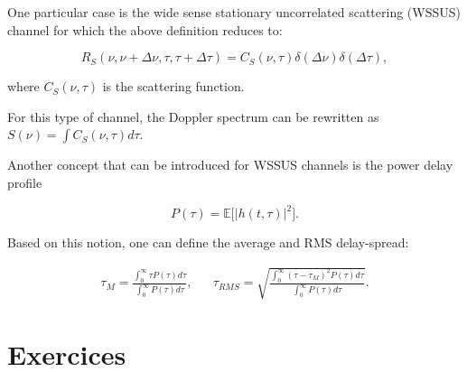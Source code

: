 \documentclass [a4paper, 11pt] {article}
\begin{document}
\begin{reminder}
\begin{itemize}
    
    
    One particular case is the wide sense stationary uncorrelated scattering (WSSUS) channel for which the above definition reduces to: 
    
        \begin{equation}
        R_S(\nu,\nu+\Delta \nu, \tau, \tau + \Delta \tau) = C_S(\nu, \tau) \delta(\Delta \nu) \delta(\Delta \tau),
        \end{equation}
    
    
    where $C_S(\nu, \tau)$ is the scattering function. 
    
    
    For this type of channel, the Doppler spectrum can be rewritten as $S(\nu) = \int C_S(\nu, \tau) d\tau$. 
    
    
    Another concept that can be introduced for WSSUS channels is the power delay profile
    
    \begin{equation}
    P(\tau) = \mathbb{E}\Big[|h(t,\tau)|^2\Big].
    \end{equation}
    
    Based on this notion, one can define the average and RMS delay-spread: 
    
    \begin{align}
    \tau_M = \frac{\int_0^\infty \tau P(\tau) d\tau}{\int_0^\infty P(\tau) d\tau}, && \tau_{RMS} = \sqrt{\frac{\int_0^\infty (\tau - \tau_M)^2 P(\tau) d\tau}{\int_0^\infty P(\tau) d\tau}}.
    \end{align}
    
    \end{itemize}
    \end{reminder}
    \pagebreak
    
    \part*{Exercices}
    
\end{document}
